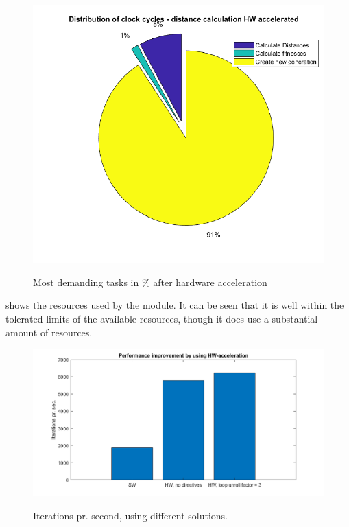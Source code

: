 \begin{figure}[H]
	\centering
	{\includegraphics[width=\textwidth]{Images/cycle_distribution_HW_accelerated.png}}\\[0.5cm]
	\caption{Most demanding tasks in \% after hardware acceleration}
	\label{fig:timing_pie_hw}
\end{figure}

 shows the resources used by the module. It can be seen that it is well within the tolerated limits of the available resources, though it does use a substantial amount of resources.

\begin{figure}[H]
	\centering
	{\includegraphics[width=\textwidth]{Images/performance_improvement_iterations_per_sec.png}}\\[0.5cm]
	\caption{Iterations pr. second, using different solutions.}
	\label{fig:iterations_per_second}
\end{figure}

